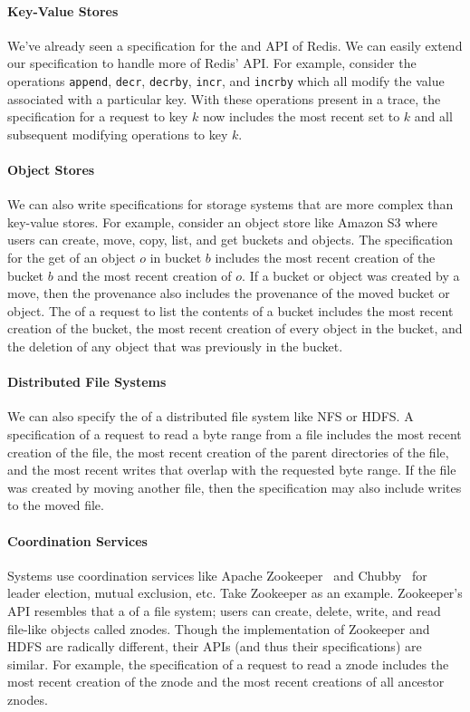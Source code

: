 \paragraph{Key-Value Stores}
We've already seen a \watprovenance{} specification for the \kvget{} and
\kvset{} API of Redis. We can easily extend our \watprovenance{} specification
to handle more of Redis' API. For example, consider the operations
\texttt{append}, \texttt{decr}, \texttt{decrby}, \texttt{incr}, and
\texttt{incrby} which all modify the value associated with a particular key.
With these operations present in a trace, the \watprovenance{} specification
for a \kvget{} request to key $k$ now includes the most recent set to $k$ and
all subsequent modifying operations to key $k$.

\paragraph{Object Stores}
We can also write \watprovenance{} specifications for storage systems that are
more complex than key-value stores. For example, consider an object store like
Amazon S3 where users can create, move, copy, list, and get buckets and
objects. The \watprovenance{} specification for the get of an object $o$ in
bucket $b$ includes the most recent creation of the bucket $b$ and the most
recent creation of $o$. If a bucket or object was created by a move, then the
provenance also includes the provenance of the moved bucket or object. The
\watprovenance{} of a request to list the contents of a bucket includes the
most recent creation of the bucket, the most recent creation of every object in
the bucket, and the deletion of any object that was previously in the bucket.

\paragraph{Distributed File Systems}
We can also specify the \watprovenance{} of a distributed file system like NFS
or HDFS. A \watprovenance{} specification of a request to read a byte range
from a file includes the most recent creation of the file, the most recent
creation of the parent directories of the file, and the most recent writes that
overlap with the requested byte range. If the file was created by moving
another file, then the \watprovenance{} specification may also include writes
to the moved file.

\paragraph{Coordination Services}
Systems use coordination services like Apache
Zookeeper~\cite{hunt2010zookeeper} and Chubby~\cite{burrows2006chubby} for
leader election, mutual exclusion, etc. Take Zookeeper as an example.
Zookeeper's API resembles that a of a file system; users can create, delete,
write, and read file-like objects called znodes. Though the implementation of
Zookeeper and HDFS are radically different, their APIs (and thus their
\watprovenance{} specifications) are similar. For example, the \watprovenance{}
specification of a request to read a znode includes the most recent creation of
the znode and the most recent creations of all ancestor znodes.

